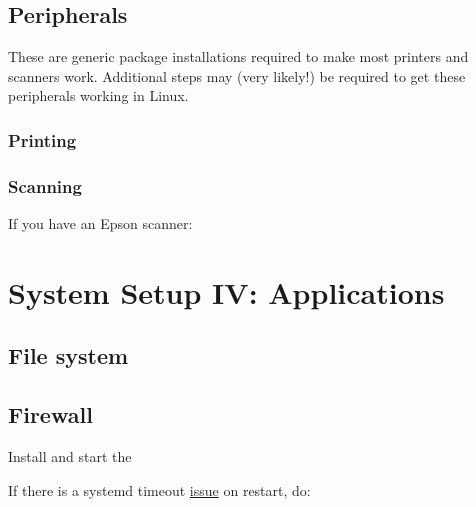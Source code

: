 \subsection{Peripherals}

These are generic package installations required to make most printers and scanners work. Additional steps may (very likely!) be required to get these peripherals working in Linux.

\subsubsection{Printing}


\subsubsection{Scanning}


\vspace*{1em}
If you have an Epson scanner:


\section{System Setup IV: Applications}

\subsection{File system}


\subsection{Firewall}

Install  and start the 

If there is a systemd timeout \href{https://bugzilla.redhat.com/show_bug.cgi?id=1294415#c10}{issue} on restart, do:

